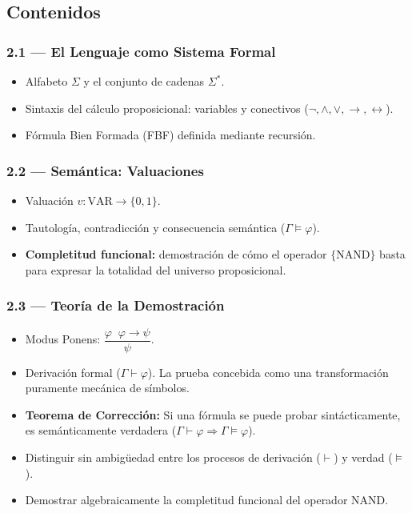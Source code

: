 \documentclass[11pt, letterpaper]{article}
\begin{document}
\subsection{Contenidos}

\subsubsection{2.1 --- El Lenguaje como Sistema Formal}
\begin{itemize}
  \item Alfabeto $\Sigma$ y el conjunto de cadenas $\Sigma^*$.
  \item Sintaxis del c\'alculo proposicional: variables y conectivos ($\neg, \land, \lor, \to, \leftrightarrow$).
  \item F\'ormula Bien Formada (FBF) definida mediante recursi\'on.
\end{itemize}

\subsubsection{2.2 --- Sem\'antica: Valuaciones}
\begin{itemize}
  \item Valuaci\'on $v:\text{VAR}\to\{0,1\}$. 
  \item Tautolog\'ia, contradicci\'on y consecuencia sem\'antica ($\Gamma\models\varphi$).
  \item \textbf{Completitud funcional:} demostraci\'on de c\'omo el operador $\{\text{NAND}\}$ basta para expresar la totalidad del universo proposicional.
\end{itemize}

\subsubsection{2.3 --- Teor\'ia de la Demostraci\'on}
\begin{itemize}
  \item Modus Ponens: $\dfrac{\varphi\;\;\varphi\to\psi}{\psi}$.
  \item Derivaci\'on formal ($\Gamma\vdash\varphi$). La prueba concebida como una transformaci\'on puramente mec\'anica de s\'imbolos.
  \item \textbf{Teorema de Correcci\'on:} Si una f\'ormula se puede probar sint\'acticamente, es sem\'anticamente verdadera ($\Gamma\vdash\varphi \Rightarrow \Gamma\models\varphi$).
\end{itemize}

\begin{objetivos}
\begin{itemize}
  \item Distinguir sin ambig\"uedad entre los procesos de derivaci\'on ($\vdash$) y verdad ($\models$).
  \item Demostrar algebraicamente la completitud funcional del operador NAND.
\end{itemize}
\end{objetivos}
\end{document}
